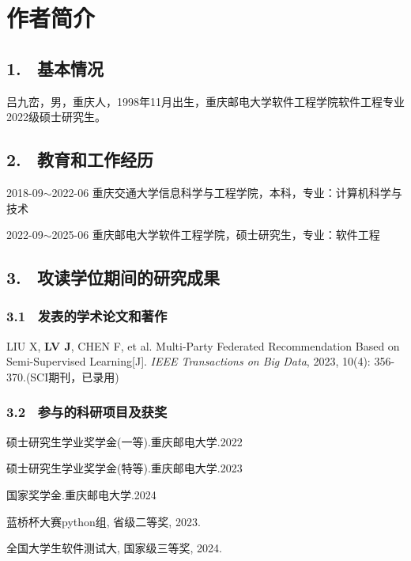 \specialsectioning


\chapter{作者简介}
\thispagestyle{others}
\pagestyle{others}
\xiaosi

\section{1. \ 基本情况}
吕九峦，男，重庆人，1998年11月出生，重庆邮电大学软件工程学院软件工程专业2022级硕士研究生。

\section{2. \ 教育和工作经历}
2018-09$\sim$2022-06 重庆交通大学信息科学与工程学院，本科，专业：计算机科学与技术

2022-09$\sim$2025-06 重庆邮电大学软件工程学院，硕士研究生，专业：软件工程

\section{3. \ 攻读学位期间的研究成果}

\vspace{0.2cm}


\subsection{3.1 \ 发表的学术论文和著作}
\begin{enumerate}[label={[{\arabic*}]}, leftmargin=2em]
	\item  LIU X, \textbf{LV J}, CHEN F, et al. Multi-Party Federated Recommendation Based on Semi-Supervised Learning[J]. \textit{IEEE Transactions on Big Data}, 2023, 10(4): 356-370.(SCI期刊，已录用)
\end{enumerate}

\subsection{3.2 \ 参与的科研项目及获奖}
\begin{enumerate}[label={[{\arabic*}]}, leftmargin=2em, itemsep=0pt, parsep=0pt, topsep=0pt]
	\item  硕士研究生学业奖学金(一等).重庆邮电大学.2022
	\item  硕士研究生学业奖学金(特等).重庆邮电大学.2023
	\item  国家奖学金.重庆邮电大学.2024
	\item  蓝桥杯大赛python组, 省级二等奖, 2023.
	\item  全国大学生软件测试大, 国家级三等奖, 2024.
\end{enumerate}






